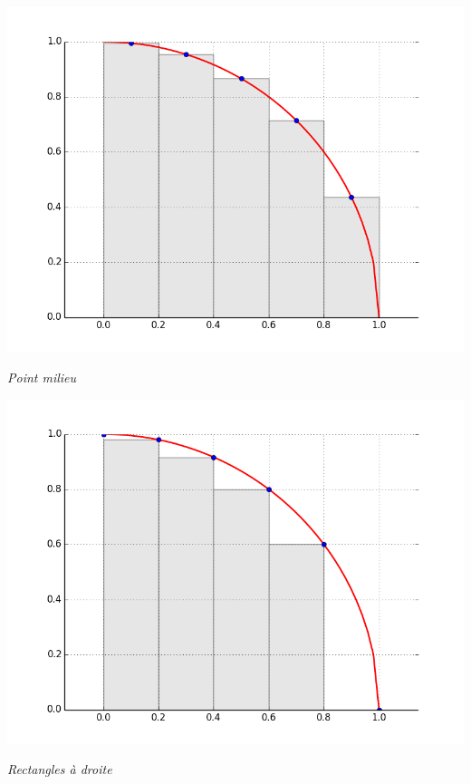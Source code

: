 \documentclass[10pt,fleqn]{article} %
\begin{document}
\begin{minipage}[c]{.24\linewidth}
\begin{center}
\includegraphics[width=.99\textwidth]{images/pi_rect_m}

\textit{Point milieu}
\end{center}
\end{minipage}\hfill
\begin{minipage}[c]{.24\linewidth}
\begin{center}
\includegraphics[width=.99\textwidth]{images/pi_rect_d}

\textit{Rectangles à droite}
\end{center}
\end{minipage}
\end{document}
